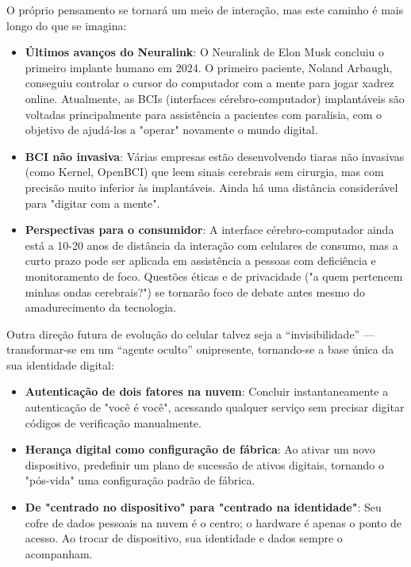 O próprio pensamento se tornará um meio de interação, mas este caminho é mais longo do que se imagina:

\begin{itemize}
  \item \textbf{Últimos avanços do Neuralink}: O Neuralink de Elon Musk concluiu o primeiro implante humano em 2024. O primeiro paciente, Noland Arbaugh, conseguiu controlar o cursor do computador com a mente para jogar xadrez online. Atualmente, as BCIs (interfaces cérebro-computador) implantáveis são voltadas principalmente para assistência a pacientes com paralisia, com o objetivo de ajudá-los a "operar" novamente o mundo digital.
  \item \textbf{BCI não invasiva}: Várias empresas estão desenvolvendo tiaras não invasivas (como Kernel, OpenBCI) que leem sinais cerebrais sem cirurgia, mas com precisão muito inferior às implantáveis. Ainda há uma distância considerável para "digitar com a mente".
  \item \textbf{Perspectivas para o consumidor}: A interface cérebro-computador ainda está a 10-20 anos de distância da interação com celulares de consumo, mas a curto prazo pode ser aplicada em assistência a pessoas com deficiência e monitoramento de foco. Questões éticas e de privacidade ("a quem pertencem minhas ondas cerebrais?") se tornarão foco de debate antes mesmo do amadurecimento da tecnologia.
\end{itemize}


Outra direção futura de evolução do celular talvez seja a “invisibilidade” — transformar-se em um “agente oculto” onipresente, tornando-se a base única da sua identidade digital:

\begin{itemize}
  \item \textbf{Autenticação de dois fatores na nuvem}: Concluir instantaneamente a autenticação de "você é você", acessando qualquer serviço sem precisar digitar códigos de verificação manualmente.
  \item \textbf{Herança digital como configuração de fábrica}: Ao ativar um novo dispositivo, predefinir um plano de sucessão de ativos digitais, tornando o "pós-vida" uma configuração padrão de fábrica.
  \item \textbf{De "centrado no dispositivo" para "centrado na identidade"}: Seu cofre de dados pessoais na nuvem é o centro; o hardware é apenas o ponto de acesso. Ao trocar de dispositivo, sua identidade e dados sempre o acompanham.
\end{itemize}

